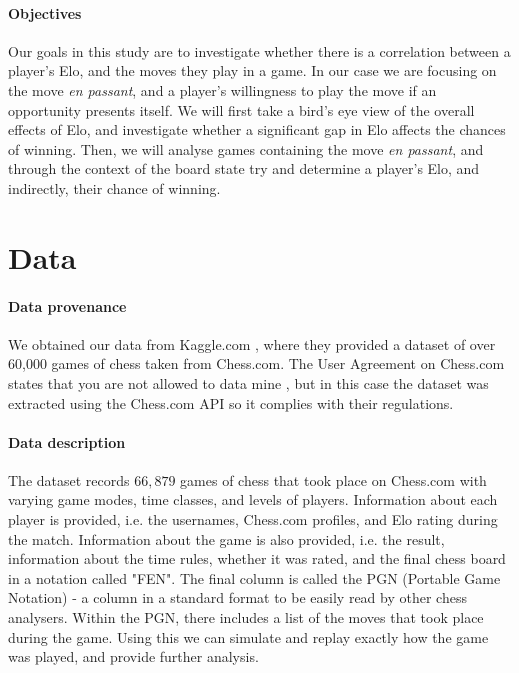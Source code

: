 \documentclass[10pt,a4paper]{article}
\begin{document}
\begin{multicols}{2}
\paragraph{Objectives}

Our goals in this study are to investigate whether there is a correlation between a player's Elo, and the moves they play in a game. In our case we are focusing on the move \textit{en passant}, and a player's willingness to play the move if an opportunity presents itself. We will first take a bird's eye view of the overall effects of Elo, and investigate whether a significant gap in Elo affects the chances of winning. Then, we will analyse games containing the move \textit{en passant}, and through the context of the board state try and determine a player's Elo, and indirectly, their chance of winning.

\section{Data}


\paragraph{Data provenance}
We obtained our data from Kaggle.com \cite{Kaggle}, where they provided a dataset of over 60,000 games of chess taken from Chess.com. The User Agreement on Chess.com states that you are not allowed to data mine \cite{ChessT&C}, but in this case the dataset was extracted using the Chess.com API so it complies with their regulations.

\paragraph{Data description}
The dataset records $66,879$ games of chess that took place on Chess.com with varying game modes, time classes, and levels of players. Information about each player is provided, i.e. the usernames, Chess.com profiles, and Elo rating during the match. Information about the game is also provided, i.e. the result, information about the time rules, whether it was rated, and the final chess board in a notation called "FEN". The final column is called the PGN (Portable Game Notation) - a column in a standard format to be easily read by other chess analysers. Within the PGN, there includes a list of the moves that took place during the game. Using this we can simulate and replay exactly how the game was played, and provide further analysis.



\end{multicols}
\end{document}
